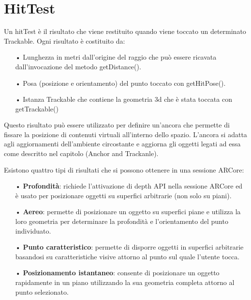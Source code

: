 \documentclass[crop=false, class=book]{standalone}
\begin{document}
	\chapter{HitTest}
	
	Un hitTest è il risultato che viene restituito quando viene toccato un determinato Trackable.
	Ogni risultato è costituito da:
	\begin{itemize}
		\item[•] Lunghezza in metri dall'origine del raggio che può essere ricavata dall'invocazione del metodo getDistance().
		\item[•] Posa (posizione e orientamento) del punto toccato con getHitPose().
		\item[•] Istanza Trackable che contiene la geometria 3d che è stata toccata con getTrackable()
	\end{itemize}
	
	\begin{flushleft}
	Questo risultato può essere utilizzato per definire un'ancora che permette di fissare la posizione di 							contenuti virtuali all'interno dello spazio. L'ancora si adatta agli aggiornamenti dell'ambiente circostante e aggiorna gli 	oggetti legati ad essa come descritto nel capitolo (Anchor and Trackanle).\\
	\end{flushleft}	
		Esistono quattro tipi di risultati che si possono ottenere in una sessione ARCore:
		\begin{itemize}
		\item[•] \textbf{Profondità}: richiede l'attivazione di depth API nella sessione ARCore ed è usato per posizionare oggetti su superfici arbitrarie (non solo su piani).
		\item[•]\textbf{Aereo}: permette di posizionare un oggetto su superfici piane e utilizza la loro geometria per determinare la profondità e l'orientamento del punto individuato.
		\item[•] \textbf{Punto caratteristico}: permette di disporre oggetti in superfici arbitrarie basandosi su caratteristiche visive attorno al punto sul quale l'utente tocca. 
		\item[•] \textbf{Posizionamento istantaneo}: consente di posizionare un oggetto rapidamente in un piano utilizzando la sua geometria completa attorno al punto selezionato. 
	\end{itemize}
	\clearpage
	
\end{document}
